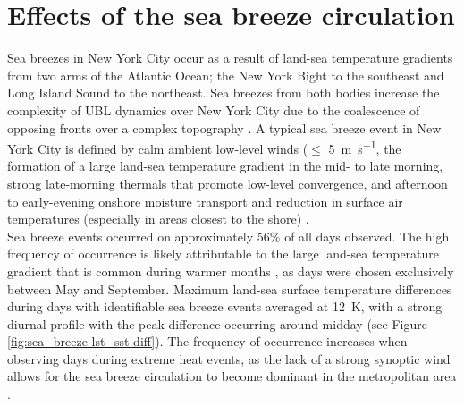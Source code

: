 \documentclass[11pt,a4paper]{article}
\begin{document}
\section{Effects of the sea breeze circulation} \label{section:sea_breeze_effects} 
Sea breezes in New York City occur as a result of land-sea temperature gradients from two arms of the Atlantic Ocean; the New York Bight to the southeast and Long Island Sound to the northeast. Sea breezes from both bodies increase the complexity of UBL dynamics over New York City due to the coalescence of opposing fronts over a complex topography \citep{bornstein1981}. A typical sea breeze event in New York City is defined by calm ambient low-level winds ($\leq$ \SI{5}{\meter\per\second}, the formation of a large land-sea temperature gradient in the mid- to late morning, strong late-morning thermals that promote low-level convergence, and afternoon to early-evening onshore moisture transport and reduction in surface air temperatures (especially in areas closest to the shore) \citep{childs2005, frizzola1963, gedzelman2003}. 
\\
Sea breeze events occurred on approximately 56\% of all days observed. The high frequency of occurrence is likely attributable to the large land-sea temperature gradient that is common during warmer months \citep{gedzelman2003}, as days were chosen exclusively between May and September. Maximum land-sea surface temperature differences during days with identifiable sea breeze events averaged at \SI{12}{\kelvin}, with a strong diurnal profile with the peak difference occurring around midday (see Figure \ref{fig:sea_breeze-lst_sst-diff}). The frequency of occurrence increases when observing days during extreme heat events, as the lack of a strong synoptic wind allows for the sea breeze circulation to become dominant in the metropolitan area \citep{miller2003}. 
\end{document}
